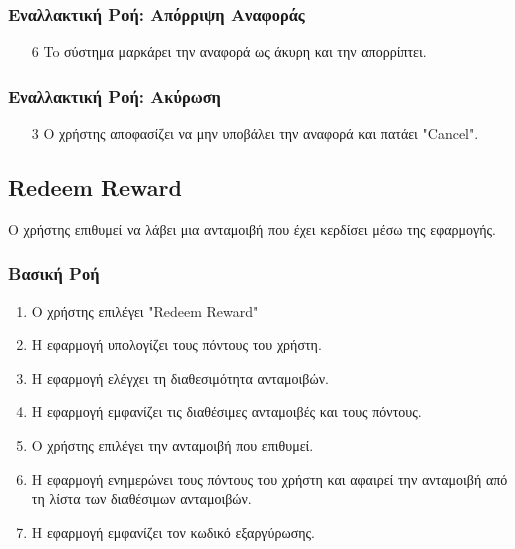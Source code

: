 \subsubsection{Εναλλακτική Ροή: Απόρριψη Αναφοράς}

\begin{enumerate}
    \item[6] To σύστημα μαρκάρει την αναφορά ως άκυρη και την απορρίπτει.
\end{enumerate}

\subsubsection{Εναλλακτική Ροή: Ακύρωση}

\begin{enumerate}
    \item[3] Ο χρήστης αποφασίζει να μην υποβάλει την αναφορά και πατάει "Cancel".
\end{enumerate}

\newpage

\subsection{Redeem Reward}
\label{uc:redeem-reward}

Ο χρήστης επιθυμεί να λάβει μια ανταμοιβή που έχει κερδίσει μέσω της εφαρμογής.

\subsubsection{Βασική Ροή}

\begin{enumerate}
    \item Ο χρήστης επιλέγει "Redeem Reward"
    \item Η εφαρμογή υπολογίζει τους πόντους του χρήστη.
    \item H εφαρμογή ελέγχει τη διαθεσιμότητα ανταμοιβών.
    \item Η εφαρμογή εμφανίζει τις διαθέσιμες ανταμοιβές και τους πόντους.
    \item Ο χρήστης επιλέγει την ανταμοιβή που επιθυμεί.
    \item Η εφαρμογή ενημερώνει τους πόντους του χρήστη και αφαιρεί την ανταμοιβή
          από τη λίστα των διαθέσιμων ανταμοιβών.
    \item Η εφαρμογή εμφανίζει τον κωδικό εξαργύρωσης.
\end{enumerate}

